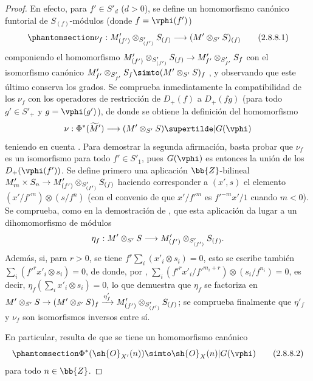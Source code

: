 \documentclass[oneside,10pt]{amsart}
\makeatletter
\newcommand{\ega@arrow}[2]{\mathchoice{#1}{#2}{#2}{#2}}
\renewcommand{\to}{\ega@arrow{\longrightarrow}{\rightarrow}}
\newcommand{\oldpage}[2][]{\marginnote{\normalfont\footnotesize\textbf{#1}~|~#2}\ignorespaces}
\let\EGAOriginalLabel\label
\renewcommand{\label}[1]{\phantomsection\EGAOriginalLabel{#1}}
\makeatother
\begin{document}
\begin{proof}
En efecto, para $f'\in S'_d$ ($d>0$), se define un homomorfismo canónico funtorial de $S_{(f)}$-módulos (donde $f=\vphi(f')$)
\[
\label{II.2.8.8.1}
  \nu_f: M'_{(f')}\otimes_{S'_{(f')}}S_{(f)} \to (M'\otimes_{S'}S)_{(f)}
\tag{2.8.8.1}
\]
componiendo el homomorfismo $M'_{(f')}\otimes_{S'_{(f')}}S_{(f)}\to M'_{f'}\otimes_{S'_{f'}}S_f$ con el isomorfismo canónico $M'_{f'}\otimes_{S'_{f'}}S_f\simto(M'\otimes_{S'}S)_f$ , y observando que este último conserva los grados.
Se comprueba inmediatamente la compatibilidad de los $\nu_f$ con los operadores de restricción de $D_+(f)$ a $D_+(fg)$ (para todo $g'\in S'_+$ y $g=\vphi(g')$), de donde se obtiene la definición del homomorfismo
\[
  \nu: \Phi^*(\widetilde M') \to (M'\otimes_{S'}S)\supertilde|G(\vphi)
\]
teniendo en cuenta .
Para demostrar la segunda afirmación, basta probar que $\nu_f$ es un isomorfismo para todo $f'\in S'_1$, pues $G(\vphi)$ es entonces la unión de los $D_+(\vphi(f'))$.
Se define primero una aplicación $\bb{Z}$-bilineal $M'_m\times S_n\to M'_{(f')}\otimes_{S'_{(f')}}S_{(f)}$ haciendo corresponder a $(x',s)$ el elemento $(x'/{f'}^m)\otimes(s/f^n)$ (con el convenio de que $x'/{f'}^m$ es ${f'}^{-m}x'/1$ cuando $m<0$).
\oldpage[II]{45}
Se comprueba, como en la demostración de , que esta aplicación da lugar a un dihomomorfismo de módulos
\[
  \eta_f: M'\otimes_{S'}S \to M'_{(f')}\otimes_{S'_{(f')}}S_{(f)}.
\]
Además, si, para $r>0$, se tiene $f^r\sum_i(x'_i\otimes s_i)=0$, esto se escribe también $\sum_i({f'}^rx'_i\otimes s_i)=0$, de donde, por , $\sum_i({f'}^rx'_i/{f'}^{m_i+r})\otimes(s_i/f^{n_i})=0$, es decir, $\eta_f(\sum_i x'_i\otimes s_i)=0$, lo que demuestra que $\eta_f$ se factoriza en $M'\otimes_{S'}S\to(M'\otimes_{S'}S)_f\xrightarrow{\eta'_f}M'_{(f')}\otimes_{S'_{(f')}}S_{(f)}$; se comprueba finalmente que $\eta'_f$ y $\nu_f$ son isomorfismos inversos entre sí.

En particular, resulta de  que se tiene un homomorfismo canónico
\[
\label{II.2.8.8.2}
  \Phi^*(\sh{O}_{X'}(n)) \simto \sh{O}_X(n)|G(\vphi)
\tag{2.8.8.2}
\]
para todo $n\in\bb{Z}$.
\end{proof}
\end{document}
